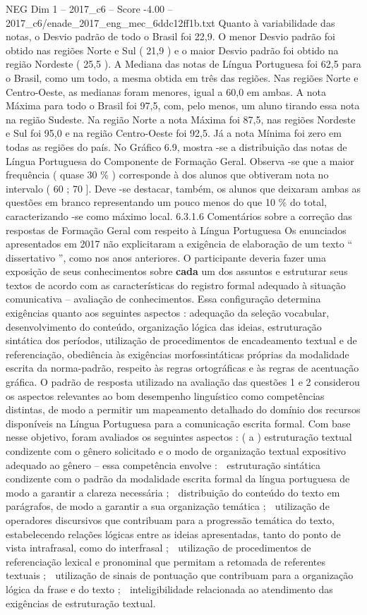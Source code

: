 \begin{textsample}{NEG Dim 1 – 2017\_c6 – Score -4.00 – 2017\_c6/enade\_2017\_eng\_mec\_6ddc12ff1b.txt}
Quanto à variabilidade das notas, o Desvio padrão de todo o Brasil foi 22,9.
O menor Desvio padrão foi obtido nas regiões Norte e Sul ( 21,9 ) e o maior Desvio padrão foi obtido na região Nordeste ( 25,5 ).
A Mediana das notas de Língua Portuguesa foi 62,5 para o Brasil, como um todo, a mesma obtida em três das regiões.
Nas regiões Norte e Centro-Oeste, as medianas foram menores, igual a 60,0 em ambas.
A nota Máxima para todo o Brasil foi 97,5, com, pelo menos, um aluno tirando essa nota na região Sudeste.
Na região Norte a nota Máxima foi 87,5, nas regiões Nordeste e Sul foi 95,0 e na região Centro-Oeste foi 92,5.
Já a nota Mínima foi zero em todas as regiões do país.
No Gráfico 6.9, mostra -se a distribuição das notas de Língua Portuguesa do Componente de Formação Geral.
Observa -se que a maior frequência ( quase 30 \% ) corresponde à dos alunos que obtiveram nota no intervalo ( 60 ; 70 ].
Deve -se destacar, também, os alunos que deixaram ambas as questões em branco representando um pouco menos do que 10 \% do total, caracterizando -se como máximo local. 6.3.1.6 Comentários sobre a correção das respostas de Formação Geral com respeito à Língua Portuguesa Os enunciados apresentados em 2017 não explicitaram a exigência de elaboração de um texto “ dissertativo ”, como nos anos anteriores.
O participante deveria fazer uma exposição de seus conhecimentos sobre \textbf{cada} um dos assuntos e estruturar seus textos de acordo com as características do registro formal adequado à situação comunicativa – avaliação de conhecimentos.
Essa configuração determina exigências quanto aos seguintes aspectos : adequação da seleção vocabular, desenvolvimento do conteúdo, organização lógica das ideias, estruturação sintática dos períodos, utilização de procedimentos de encadeamento textual e de referenciação, obediência às exigências morfossintáticas próprias da modalidade escrita da norma-padrão, respeito às regras ortográficas e às regras de acentuação gráfica.
O padrão de resposta utilizado na avaliação das questões 1 e 2 considerou os aspectos relevantes ao bom desempenho linguístico como competências distintas, de modo a permitir um mapeamento detalhado do domínio dos recursos disponíveis na Língua Portuguesa para a comunicação escrita formal.
Com base nesse objetivo, foram avaliados os seguintes aspectos : ( a ) estruturação textual condizente com o gênero solicitado e o modo de organização textual expositivo adequado ao gênero – essa competência envolve :  estruturação sintática condizente com o padrão da modalidade escrita formal da língua portuguesa de modo a garantir a clareza necessária ;  distribuição do conteúdo do texto em parágrafos, de modo a garantir a sua organização temática ;  utilização de operadores discursivos que contribuam para a progressão temática do texto, estabelecendo relações lógicas entre as ideias apresentadas, tanto do ponto de vista intrafrasal, como do interfrasal ;  utilização de procedimentos de referenciação lexical e pronominal que permitam a retomada de referentes textuais ;  utilização de sinais de pontuação que contribuam para a organização lógica da frase e do texto ;  inteligibilidade relacionada ao atendimento das exigências de estruturação textual.

\end{textsample}
